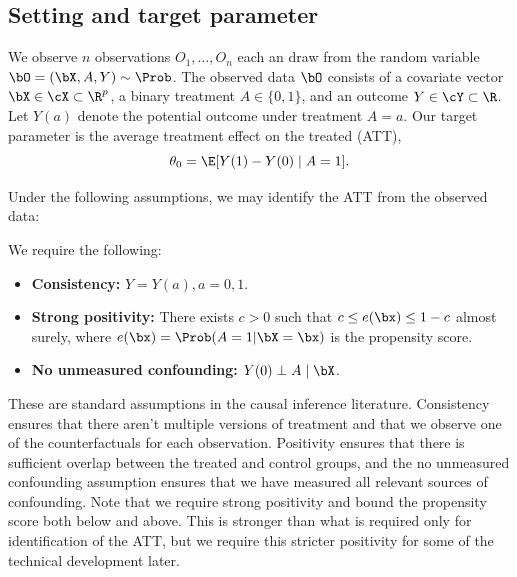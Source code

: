 \documentclass[12pt]{article}
\begin{document}
\subsection{Setting and target parameter}

We observe $n$ observations $O_1, \ldots, O_n$ each an \iid draw from the random variable $\bO = (\bX, A, Y) \sim \Prob$. The observed data $\bO$ consists of a covariate vector $\bX \in \cX \subset \R^p$, a binary treatment $A \in \{0,1\}$, and an outcome $Y \in \cY \subset \R$. Let $Y(a)$ denote the potential outcome under treatment $A = a$. Our target parameter is the average treatment effect on the treated (ATT),
\begin{equation}
\label{eq:att}
\theta_0 = \E[Y(1) - Y(0) \mid A=1].
\end{equation}

Under the following assumptions, we may identify the ATT from the observed data:
\begin{assumption}\label{assump:causal-inf-assumps}
    We require the following:
\begin{itemize}
\item \textbf{Consistency:} $Y = Y(a), a = 0, 1$.
\item \textbf{Strong positivity:} There exists $c > 0$ such that $c \le e(\bx) \le 1-c$ almost surely, where $e(\bx) = \Prob(A=1|\bX=\bx)$ is the propensity score.
\item \textbf{No unmeasured confounding:} $Y(0) \perp A \mid \bX$.
\end{itemize} 
\end{assumption}
These are standard assumptions in the causal inference literature. Consistency ensures that there aren't multiple versions of treatment and that we observe one of the counterfactuals for each observation. Positivity ensures that there is sufficient overlap between the treated and control groups, and the no unmeasured confounding assumption ensures that we have measured all relevant sources of confounding. Note that we require strong positivity and bound the propensity score both below and above. This is stronger than what is required only for identification of the ATT, but we require this stricter positivity for some of the technical development later.
\end{document}
